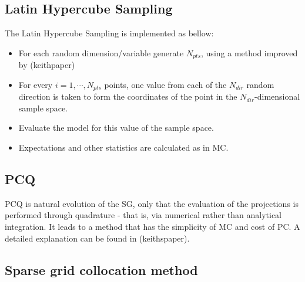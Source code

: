 \documentclass{article}
\begin{document}
\subsection{Latin Hypercube Sampling}
The Latin Hypercube Sampling is implemented as bellow:
\begin{itemize}
\item For each random dimension/variable generate $N_{pts}$, using a method improved by (keithpaper)
\item For every $i=1,\cdots,N_{pts}$ points, one value from each of the $N_{dir}$ random direction is taken
to form the coordinates of the point in the $N_{dir}$-dimensional sample space.
\item Evaluate the model for this value of the sample space.
\item Expectations and other statistics are calculated as in MC. 
\end{itemize}

\subsection{PCQ}
PCQ is natural evolution of the SG, only that the evaluation of the projections is performed 
through quadrature - that is, via numerical rather than analytical integration. 
It leads to a method that has the simplicity of MC and cost of PC. A detailed explanation
can be found in (keithspaper).

\subsection{Sparse grid collocation method}
\end{document}
